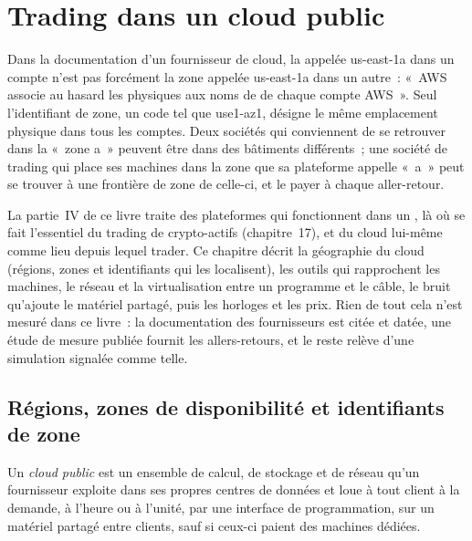 \chapter{Trading dans un cloud public}\label{ch:nw:trading-in-a-public-cloud}

Dans la documentation d'un fournisseur de cloud, la  appelée us-east-1a dans un compte n'est pas forcément la zone appelée us-east-1a
dans un autre~: «~AWS associe au hasard les  physiques aux noms de  de chaque compte AWS~». Seul
l'identifiant de zone, un code tel que use1-az1, désigne le même emplacement physique dans tous les comptes. Deux sociétés qui conviennent de se retrouver dans la «~zone a~» peuvent être
dans des bâtiments différents~; une société de trading qui place ses machines dans la zone que sa plateforme appelle «~a~» peut se trouver à une frontière de zone de celle-ci, et
le payer à chaque aller-retour.

La partie~IV de ce livre traite des plateformes qui fonctionnent dans un , là où se fait l'essentiel du trading de crypto-actifs (chapitre~17), et du
cloud lui-même comme lieu depuis lequel trader. Ce chapitre décrit la géographie du cloud (régions, zones et identifiants qui les localisent),
les outils qui rapprochent les machines, le réseau et la virtualisation entre un programme et le câble, le bruit qu'ajoute
le matériel partagé, puis les horloges et les prix. Rien de tout cela n'est mesuré dans ce livre~: la documentation des fournisseurs est citée et datée, une
étude de mesure publiée fournit les allers-retours, et le reste relève d'une simulation signalée comme telle.

\section{Régions, zones de disponibilité et identifiants de zone}

\begin{definition}\label{def:nw:trading-in-a-public-cloud:cloud}
Un \emph{cloud public} est un ensemble de calcul, de stockage et de réseau qu'un fournisseur exploite dans ses propres centres
de données et loue à tout client à la demande, à l'heure ou à l'unité, par une interface de programmation, sur un matériel partagé entre clients, sauf si
ceux-ci paient des machines dédiées.
\end{definition}

